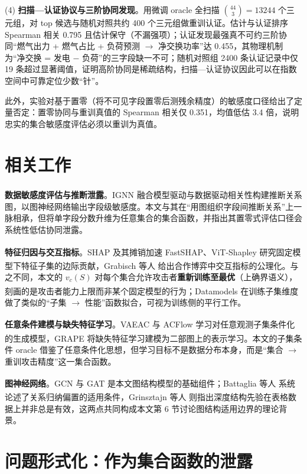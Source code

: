 \documentclass[10.5pt,compsoc,UTF8]{CjC}
\theoremstyle{mystyle}
\newcommand{\upcite}[1]{\textsuperscript{\cite{#1}}}
\begin{document}
(4) \textbf{扫描—认证协议与三阶协同发现}。用微调 oracle 全扫描 $\binom{44}{3}=13244$ 个三元组，对 top 候选与随机对照共约 400 个三元组做重训认证。估计与认证排序 Spearman 相关 0.795 且估计保守（不漏强项）；认证发现最强真不可约三阶协同“燃气出力 + 燃气占比 + 负荷预测 $\to$ 净交换功率”达 0.455，其物理机制为“净交换 = 发电 $-$ 负荷”的三字段缺一不可；随机对照组 2400 条认证记录中仅 19 条超过显著阈值，证明高阶协同是稀疏结构，扫描—认证协议因此可以在指数空间中可靠定位少数“针”。

此外，实验对基于置零（将不可见字段置零后测残余精度）的敏感度口径给出了定量否定：置零协同与重训真值的 Spearman 相关仅 0.351，均值低估 3.4 倍，说明忠实的集合敏感度评估必须以重训为真值。

\section{\heiti 相关工作}

\textbf{数据敏感度评估与推断泄露}。IGNN\upcite{hu2026ignn} 融合模型驱动与数据驱动相关性构建推断关系图，以图神经网络输出字段级敏感度。本文与其在“用图组织字段间推断关系”上一脉相承，但将单字段分数升维为任意集合的集合函数，并指出其置零式评估口径会系统性低估协同泄露。

\textbf{特征归因与交互指标}。SHAP\upcite{lundberg2017shap} 及其摊销加速 FastSHAP\upcite{jethani2022fastshap}、ViT-Shapley\upcite{covert2023vitshapley} 研究固定模型下特征子集的边际贡献，Grabisch 等人\upcite{grabisch1999interaction} 给出合作博弈中交互指标的公理化。与之不同，本文的 $v_c(S)$ 对每个集合允许攻击者\textbf{重新训练至最优}（上确界语义），刻画的是攻击者能力上限而非某个固定模型的行为；Datamodels\upcite{ilyas2022datamodels} 在训练子集维度做了类似的“子集 $\to$ 性能”函数拟合，可视为训练侧的平行工作。

\textbf{任意条件建模与缺失特征学习}。VAEAC\upcite{ivanov2019vaeac} 与 ACFlow\upcite{li2020acflow} 学习对任意观测子集条件化的生成模型，GRAPE\upcite{you2020grape} 将缺失特征学习建模为二部图上的表示学习。本文的子集条件 oracle 借鉴了任意条件化思想，但学习目标不是数据分布本身，而是“集合 $\to$ 重训攻击精度”这一集合函数。

\textbf{图神经网络}。GCN\upcite{kipf2017gcn} 与 GAT\upcite{velickovic2018gat} 是本文图结构模型的基础组件；Battaglia 等人\upcite{battaglia2018relational} 系统论述了关系归纳偏置的适用条件，Grinsztajn 等人\upcite{grinsztajn2022tabular} 则指出深度结构先验在表格数据上并非总是有效，这两点共同构成本文第 6 节讨论图结构适用边界的理论背景。

\section{\heiti 问题形式化：作为集合函数的泄露}
\end{document}
